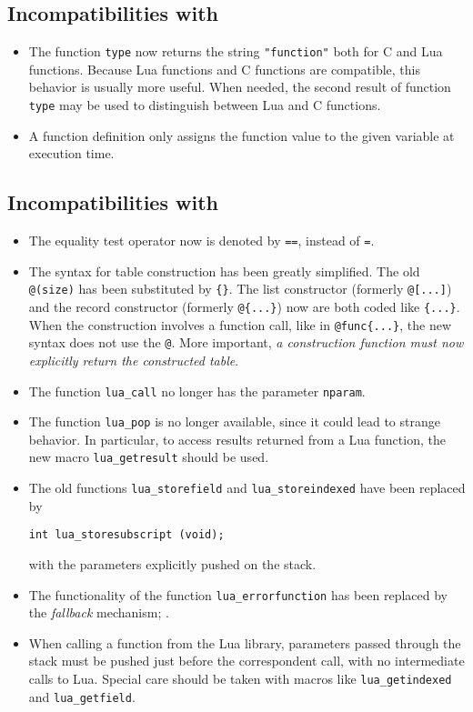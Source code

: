 \subsection*{Incompatibilities with }
\begin{itemize}
\item
The function \verb'type' now returns the string \verb'"function"'
both for C and Lua functions.
Because Lua functions and C functions are compatible,
this behavior is usually more useful.
When needed, the second result of function {\tt type} may be used
to distinguish between Lua and C functions.
\item
A function definition only assigns the function value to the
given variable at execution time.
\end{itemize}

\subsection*{Incompatibilities with }
\begin{itemize}
\item
The equality test operator now is denoted by \verb'==',
instead of \verb'='.
\item
The syntax for table construction has been greatly simplified.
The old \verb'@(size)' has been substituted by \verb'{}'.
The list constructor (formerly \verb'@[...]') and the record
constructor (formerly \verb'@{...}') now are both coded like
\verb'{...}'.
When the construction involves a function call,
like in \verb'@func{...}',
the new syntax does not use the \verb'@'.
More important, {\em a construction function must now
explicitly return the constructed table}.
\item
The function \verb'lua_call' no longer has the parameter \verb'nparam'.
\item
The function \verb'lua_pop' is no longer available,
since it could lead to strange behavior.
In particular,
to access results returned from a Lua function,
the new macro \verb'lua_getresult' should be used.
\item
The old functions \verb'lua_storefield' and \verb'lua_storeindexed'
have been replaced by
\begin{verbatim}
int lua_storesubscript (void);
\end{verbatim}
with the parameters explicitly pushed on the stack.
\item
The functionality of the function \verb'lua_errorfunction' has been
replaced by the {\em fallback} mechanism; .
\item
When calling a function from the Lua library,
parameters passed through the stack
must be pushed just before the correspondent call,
with no intermediate calls to Lua.
Special care should be taken with macros like
\verb'lua_getindexed' and \verb'lua_getfield'.
\end{itemize}

\newcommand{\indexentry}[2]{\item {#1} #2}
\begin{theindex}

\end{theindex}

\pagebreak
\tableofcontents


